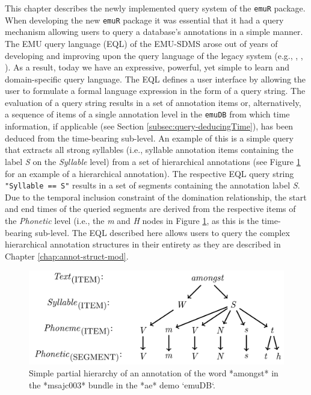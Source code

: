 \documentclass[]{book}
\begin{document}
This chapter describes the newly implemented query system of the \texttt{emuR} package. When developing the new \texttt{emuR} package it was essential that it had a query mechanism allowing users to query a database's annotations in a simple manner. The EMU query language (EQL) of the EMU-SDMS arose out of years of developing and improving upon the query language of the legacy system (e.g., \citet{cassidy:sc2001a}, \citet{harrington:2010a}, \citet{john:2012a}). As a result, today we have an expressive, powerful, yet simple to learn and domain-specific query language. The EQL defines a user interface by allowing the user to formulate a formal language expression in the form of a query string. The evaluation of a query string results in a set of annotation items or, alternatively, a sequence of items of a single annotation level in the \texttt{emuDB} from which time information, if applicable (see Section \ref{subsec:query-deducingTime}), has been deduced from the time-bearing sub-level. An example of this is a simple query that extracts all strong syllables (i.e., syllable annotation items containing the label \emph{S} on the \emph{Syllable} level) from a set of hierarchical annotations (see Figure \ref{fig:amongstHier} for an example of a hierarchical annotation). The respective EQL query string \texttt{"Syllable\ ==\ S"} results in a set of segments containing the annotation label \emph{S}. Due to the temporal inclusion constraint of the domination relationship, the start and end times of the queried segments are derived from the respective items of the \emph{Phonetic} level (i.e., the \emph{m} and \emph{H} nodes in Figure \ref{fig:amongstHier}, as this is the time-bearing sub-level. The EQL described here allows users to query the complex hierarchical annotation structures in their entirety as they are described in Chapter \ref{chap:annot-struct-mod}.

\begin{figure}

{\centering \includegraphics[width=0.75\linewidth]{pics/amongstHier} 

}

\caption{Simple partial hierarchy of an annotation of the word *amongst* in the *msajc003* bundle in the *ae* demo `emuDB`.}\label{fig:amongstHier}
\end{figure}
\end{document}
